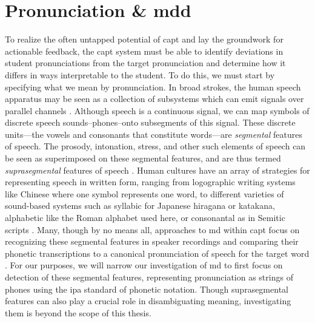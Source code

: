 \documentclass[thesis]{cluu}
\begin{document}
\section{Pronunciation \& \acrfull{mdd}} \label{mdd}
To realize the often untapped potential of \gls{capt} and lay the groundwork for actionable feedback, the \gls{capt} system must be able to identify deviations in student pronunciations from the target pronunciation and determine how it differs in ways interpretable to the student. To do this, we must start by specifying what we mean by pronunciation. In broad strokes, the human speech apparatus may be seen as a collection of subsystems which can emit signals over parallel channels \parencite[p. 173]{engstrandFonetikensGrunder2004}. Although speech is a continuous signal, we can map symbols of discrete speech sounds--phones--onto subsegments of this signal. These discrete units---the vowels and consonants that constitute words---are \textit{segmental} features of speech. The prosody, intonation, stress, and other such elements of speech can be seen as superimposed on these segmental features, and are thus termed \textit{suprasegmental} features of speech \parencite{engstrandFonetikensGrunder2004}. Human cultures have an array of strategies for representing speech in written form, ranging from logographic writing systems like Chinese where one symbol represents one word, to different varieties of sound-based systems such as syllabic for Japanese hiragana or katakana, alphabetic like the Roman alphabet used here, or consonantal as in Semitic scripts \parencite{jurafskySpeechLanguageProcessing2025}. Many, though by no means all, approaches to \gls{md} within \gls{capt} focus on recognizing these segmental features in speaker recordings and comparing their phonetic transcriptions to a canonical pronunciation of speech for the target word \parencite{korzekwaComputerassistedPronunciationTraining2022}. For our purposes, we will narrow our investigation of \gls{md} to first focus on detection of these segmental features, representing pronunciation as strings of phones using the \gls{ipa} standard of phonetic notation. Though suprasegmental features can also play a crucial role in disambiguating meaning, investigating them is beyond the scope of this thesis.
\end{document}
